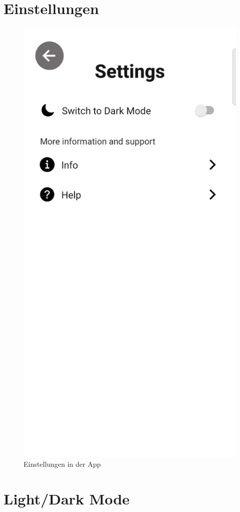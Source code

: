 \section{Einstellungen}

\begin{figure}[H]
    \centering
    \includegraphics[height=\textwidth]{./pics/Settings.jpg}
    \caption{Einstellungen in der App}
\end{figure}

\section{Light/Dark Mode}

